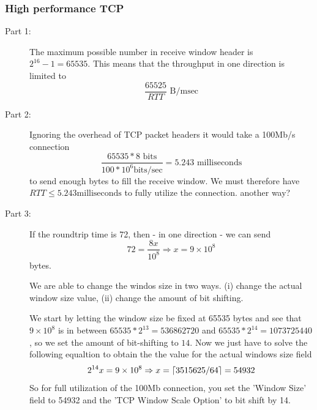 \subsubsection{High performance TCP}
\begin{description}
    \item[Part 1:] The maximum possible number in receive window header is
        $2^{16}-1 = 65535$. This means that the throughput in one direction is
        limited to \[\frac{65525}{RTT} \text{ B/msec}\] %
    \item[Part 2:] Ignoring the overhead of TCP packet headers it would take a
        100Mb/s connection \[ \frac{65535 * 8 \text{ bits}}{100 * 10^{6} \text{
        bits/sec}} = 5.243 \text{ milliseconds} \] to send enough bytes to fill
        the receive window. We must therefore have $RTT \leq 5.243 \text{
        milliseconds}$ to fully utilize the connection. %
        another way?
    \item[Part 3:] If the roundtrip time is 72, then - in one direction - we
        can send $$72=\frac{8x}{10^8} \Rightarrow x = 9 \times 10^8$$ bytes.
        
        We are able to change the windos size in two ways. (i) change the
        actual window size value, (ii) change the amount of bit shifting.
        
        We start by letting the window size be fixed at 65535 bytes and see
        that $9\times10^8$ is in between $65535*2^{13}=536862720$ and
        $65535*2^{14}=1073725440$, so we set the amount of bit-shifting to
        $14$. Now we just have to solve the following equaltion to obtain the
        the value for the actual windows size field $$2^{14}x=9\times10^8
        \Rightarrow x=\left\lceil{3515625/64}\right\rceil = 54932$$ So for full utilization of
        the 100Mb connection, you set the 'Window Size' field to 54932 and the
        'TCP Window Scale Option' to bit shift by 14.


\end{description}

